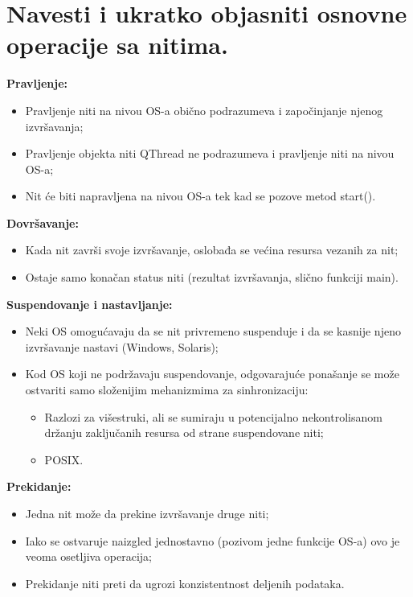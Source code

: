 \documentclass[a4paper]{article}
\begin{document}
\section{Navesti i ukratko objasniti osnovne operacije sa nitima.}
  \noindent \textbf{Pravljenje:}
    \begin{itemize}
      \item Pravljenje niti na nivou OS-a obično podrazumeva i započinjanje njenog izvršavanja;
      \item Pravljenje objekta niti QThread ne podrazumeva i pravljenje niti na nivou OS-a;
      \item Nit će biti napravljena na nivou OS-a tek kad se pozove metod start().
    \end{itemize}
  \textbf{Dovršavanje:}
    \begin{itemize}
      \item Kada nit završi svoje izvršavanje, oslobađa se većina resursa vezanih za nit;
      \item Ostaje samo konačan status niti (rezultat izvršavanja, slično funkciji main).
    \end{itemize}
  \textbf{Suspendovanje i nastavljanje:}
    \begin{itemize}
      \item Neki OS omogućavaju da se nit privremeno suspenduje i da se kasnije njeno 
            izvršavanje nastavi (Windows, Solaris);
      \item Kod OS koji ne podržavaju suspendovanje, odgovarajuće ponašanje se može ostvariti 
            samo složenijim mehanizmima za sinhronizaciju:
            \begin{itemize}
              \item Razlozi za višestruki, ali se sumiraju u potencijalno nekontrolisanom držanju 
                    zaključanih resursa od strane suspendovane niti;
              \item POSIX.
            \end{itemize}
    \end{itemize}
  \textbf{Prekidanje:}
    \begin{itemize}
      \item Jedna nit može da prekine izvršavanje druge niti;
      \item Iako se ostvaruje naizgled jednostavno (pozivom jedne funkcije OS-a) 
            ovo je veoma osetljiva operacija;
      \item Prekidanje niti preti da ugrozi konzistentnost deljenih podataka.
    \end{itemize}
\end{document}
